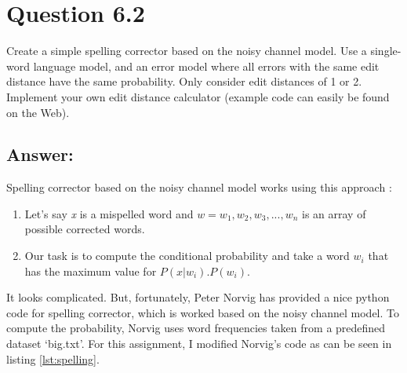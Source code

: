 \documentclass[letterpaper,11pt]{article}
\begin{document}
\noindent\makebox[\linewidth]{\rule{\textwidth}{0.4pt}}

\section*{Question 6.2}
\begin{spverbatim}
Create a simple spelling corrector based on the noisy channel model. Use a single-word language model, and an error model where all errors with the same edit distance have the same probability. Only consider edit distances of 1 or 2. Implement your own edit distance calculator (example code can easily be found on the Web).
\end{spverbatim}

\subsection*{Answer:}
Spelling corrector based on the noisy channel model works using this approach \cite{spelling}:
\begin{enumerate}
\item Let's say \textit{x} is a mispelled word and \( w = w_{1}, w_{2}, w_{3}, ..., w_{n} \) is an array of possible corrected words. 
\item Our task is to compute the conditional probability and take a word \( w_i \) that has the maximum value for \( P\left(x|w_{i}\right).P\left(w_i\right) \).
\end{enumerate}

It looks complicated. But, fortunately, Peter Norvig \cite{norvig} has provided a nice python code for spelling corrector, which is worked based on the noisy channel model. To compute the probability, Norvig uses word frequencies taken from a predefined dataset `big.txt'. For this assignment, I modified Norvig's code as can be seen in listing \ref{lst:spelling}.
\end{document}
